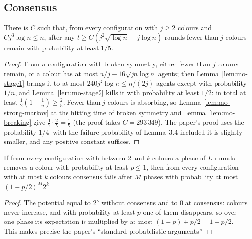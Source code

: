 \subsection{Consensus}

\begin{lemma}\label{lem:mo-phase}
\leanok
{}
There is $C$ such that, from every configuration with $j\ge2$ colours and $Cj^3\log n\le n$,
after any $t\ge C(j^2\sqrt{\log n}+j\log n)$ rounds fewer than $j$ colours remain with probability
at least $1/5$.
\end{lemma}
\begin{proof}\leanok
From a configuration with broken symmetry, either fewer than $j$ colours remain, or a colour has
at most $n/j-16\sqrt{jn\log n}$ agents; then Lemma~\ref{lem:mo-stage1} brings it to at most
$240j^2\log n\le n/(2j)$ agents except with probability $1/n$, and Lemma~\ref{lem:mo-stage2} kills
it with probability at least $1/2$: in total at least $\frac12(1-\frac1n)\ge\frac25$. Fewer than
$j$ colours is absorbing, so Lemma~\ref{lem:mo-strong-markov} at the hitting time of broken
symmetry and Lemma~\ref{lem:mo-breaking} give $\frac12\cdot\frac25=\frac15$ (the proof takes
$C=293\,349$). The paper's proof uses the probability $1/4$; with the failure probability of
Lemma~3.4 included it is slightly smaller, and any positive constant suffices.
\end{proof}

\begin{lemma}\label{lem:mo-phases}
\leanok
{}
If from every configuration with between $2$ and $k$ colours a phase of $L$ rounds removes a
colour with probability at least $p\le1$, then from every configuration with at most $k$ colours
consensus fails after $M$ phases with probability at most $(1-p/2)^M2^k$.
\end{lemma}
\begin{proof}\leanok
The potential equal to $2^{\kappa}$ without consensus and to $0$ at consensus: colours never
increase, and with probability at least $p$ one of them disappears, so over one phase its
expectation is multiplied by at most $(1-p)+p/2=1-p/2$. This makes precise the paper's
``standard probabilistic arguments''.
\end{proof}

